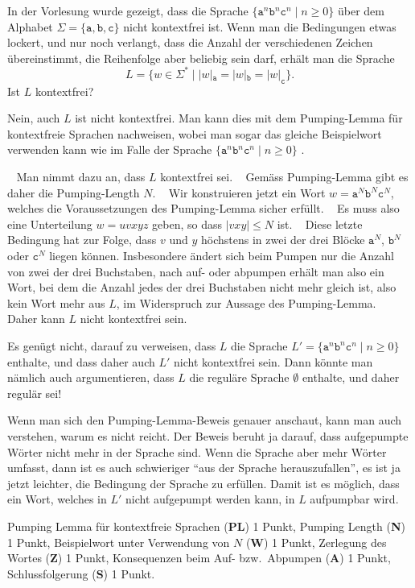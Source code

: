 In der Vorlesung wurde gezeigt, dass die Sprache
$\{\texttt{a}^n\texttt{b}^n\texttt{c}^n\;|\;n\ge 0\}$
über dem Alphabet $\Sigma=\{\texttt{a},\texttt{b},\texttt{c}\}$
nicht kontextfrei ist.
Wenn man die Bedingungen etwas lockert, und nur noch verlangt, dass die
Anzahl der verschiedenen Zeichen übereinstimmt, die Reihenfolge aber
beliebig sein darf, erhält man die Sprache
\[
L=\{w\in\Sigma^*\;|\;|w|_\texttt{a}=|w|_\texttt{b}=|w|_\texttt{c}\}.
\]
Ist $L$ kontextfrei?

\begin{loesung}
Nein, auch $L$ ist nicht kontextfrei.
Man kann dies mit dem Pumping-Lemma für kontextfreie Sprachen nachweisen,
wobei man sogar das gleiche Beispielwort verwenden kann wie im Falle der
Sprache $\{ \texttt{a}^n \texttt{b}^n \texttt{c}^n\;|\; n \ge 0\}$ .

~%
Man nimmt dazu an, dass $L$ kontextfrei sei.
~%
Gemäss Pumping-Lemma gibt es daher die Pumping-Length $N$.
~%
Wir konstruieren jetzt ein Wort
$w=\texttt{a}^N\texttt{b}^N\texttt{c}^N$, welches die Voraussetzungen
des Pumping-Lemma sicher erfüllt.
~%
Es muss also eine Unterteilung $w=uvxyz$ geben, so dass $|vxy|\le N$ ist.
~%
Diese letzte Bedingung hat zur Folge, dass $v$ und $y$ höchstens in
zwei der drei Blöcke $\texttt{a}^N$, $\texttt{b}^N$ oder $\texttt{c}^N$
liegen können.
Insbesondere ändert sich beim Pumpen nur die Anzahl von zwei der drei
Buchstaben, nach auf- oder abpumpen erhält man also ein Wort, bei dem 
die Anzahl jedes der drei Buchstaben nicht mehr gleich ist, also kein
Wort mehr aus $L$, im Widerspruch zur Aussage des Pumping-Lemma.
~%
Daher kann $L$ nicht kontextfrei sein.
\end{loesung}

\begin{diskussion}
Es genügt nicht, darauf zu verweisen, dass $L$ die Sprache
$L'=\{ \texttt{a}^n \texttt{b}^n \texttt{c}^n\;|\; n\ge 0\}$ enthalte,
und dass daher auch $L'$ nicht kontextfrei sein.  Dann könnte man nämlich auch
argumentieren, dass $L$ die reguläre Sprache $\emptyset$ enthalte, und daher
regulär sei!

Wenn man sich den Pumping-Lemma-Beweis genauer anschaut, kann man auch verstehen,
warum es nicht reicht. Der Beweis beruht ja darauf, dass aufgepumpte Wörter nicht
mehr in der Sprache sind. Wenn die Sprache aber mehr Wörter umfasst, dann ist
es auch schwieriger ``aus der Sprache herauszufallen'', es ist ja jetzt leichter,
die Bedingung der Sprache zu erfüllen. Damit ist es möglich, dass ein Wort, welches
in $L'$ nicht aufgepumpt werden kann, in $L$ aufpumpbar wird.
\end{diskussion}

\begin{bewertung}
Pumping Lemma für kontextfreie Sprachen ({\bf PL}) 1 Punkt,
Pumping Length ({\bf N}) 1 Punkt,
Beispielwort unter Verwendung von $N$ ({\bf W}) 1 Punkt,
Zerlegung des Wortes ({\bf Z}) 1 Punkt,
Konsequenzen beim Auf- bzw.~Abpumpen ({\bf A}) 1 Punkt,
Schlussfolgerung ({\bf S}) 1 Punkt.
\end{bewertung}

